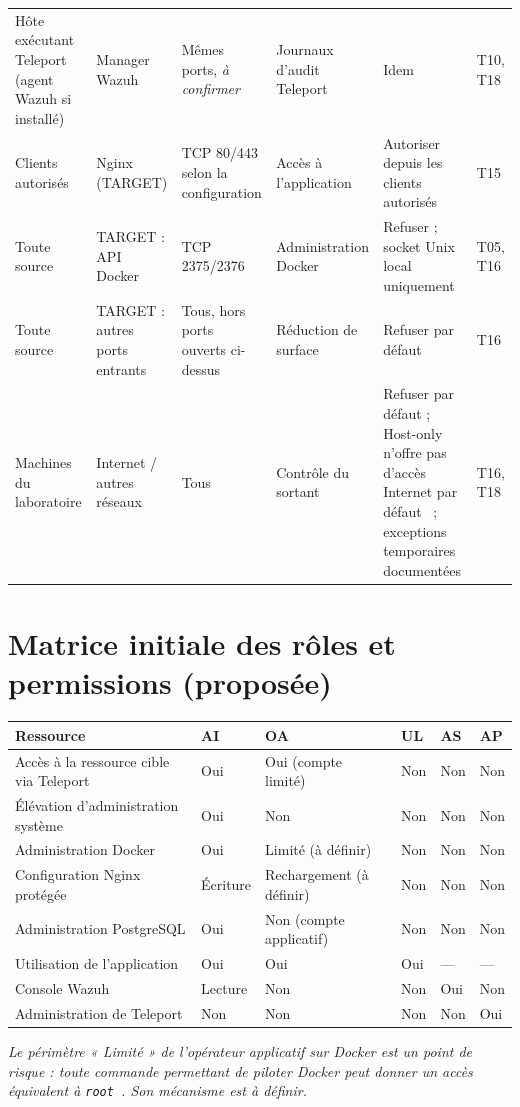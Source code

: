 \documentclass[11pt,a4paper]{report}
\newcommand{\aconf}{\emph{à confirmer}}
\begin{document}
{\begin{longtable}{@{}p{}p{}p{}p{}p{}p{}@{}}
Hôte exécutant Teleport (agent Wazuh si installé) & Manager Wazuh & Mêmes ports, \aconf{} & Journaux d'audit Teleport & Idem & T10, T18\\
Clients autorisés & Nginx (TARGET) & TCP 80/443 selon la configuration & Accès à l'application & Autoriser depuis les clients autorisés & T15\\
Toute source & TARGET : API Docker & TCP 2375/2376 & Administration Docker & Refuser ; socket Unix local uniquement & T05, T16\\
Toute source & TARGET : autres ports entrants & Tous, hors ports ouverts ci-dessus & Réduction de surface & Refuser par défaut & T16\\
Machines du laboratoire & Internet / autres réseaux & Tous & Contrôle du sortant & Refuser par défaut ; Host-only n'offre pas d'accès Internet par défaut~\cite{vmware-ho-doc} ; exceptions temporaires documentées & T16, T18\\
\bottomrule
\end{longtable}}
\normalsize

\section{Matrice initiale des rôles et permissions (proposée)}
\begin{tabularx}{\textwidth}{@{}p{3.6cm}XXXXX@{}}
\toprule\textbf{Ressource} & \textbf{AI} & \textbf{OA} & \textbf{UL} & \textbf{AS} & \textbf{AP}\\ \midrule
Accès à la ressource cible via Teleport & Oui & Oui (compte limité) & Non & Non & Non\\
Élévation d'administration système & Oui & Non & Non & Non & Non\\
Administration Docker & Oui & Limité (à définir) & Non & Non & Non\\
Configuration Nginx protégée & Écriture & Rechargement (à définir) & Non & Non & Non\\
Administration PostgreSQL & Oui & Non (compte applicatif) & Non & Non & Non\\
Utilisation de l'application & Oui & Oui & Oui & --- & ---\\
Console Wazuh & Lecture & Non & Non & Oui & Non\\
Administration de Teleport & Non & Non & Non & Non & Oui\\
\bottomrule
\end{tabularx}
\textit{Le périmètre « Limité » de l'opérateur applicatif sur Docker est un point de risque : toute commande permettant de piloter Docker peut donner un accès équivalent à \texttt{root}~\cite{docker-sec}. Son mécanisme est à définir.}
\end{document}

